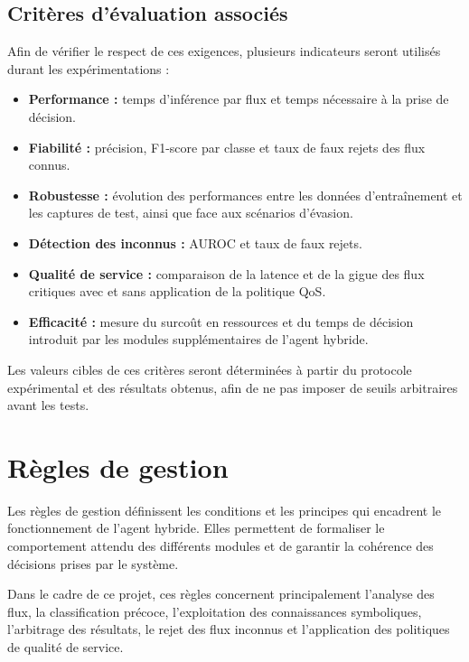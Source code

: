 \subsection{Critères d'évaluation associés}

Afin de vérifier le respect de ces exigences, plusieurs
indicateurs seront utilisés durant les expérimentations :

\begin{itemize}
    \item \textbf{Performance :} temps d'inférence par flux
    et temps nécessaire à la prise de décision.

    \item \textbf{Fiabilité :} précision, F1-score par classe
    et taux de faux rejets des flux connus.

    \item \textbf{Robustesse :} évolution des performances
    entre les données d'entraînement et les captures de test,
    ainsi que face aux scénarios d'évasion.

    \item \textbf{Détection des inconnus :} AUROC et taux
    de faux rejets.

    \item \textbf{Qualité de service :} comparaison de la
    latence et de la gigue des flux critiques avec et sans
    application de la politique QoS.

    \item \textbf{Efficacité :} mesure du surcoût en ressources
    et du temps de décision introduit par les modules
    supplémentaires de l'agent hybride.
\end{itemize}

Les valeurs cibles de ces critères seront déterminées
à partir du protocole expérimental et des résultats obtenus,
afin de ne pas imposer de seuils arbitraires avant les tests.


\section{Règles de gestion}

Les règles de gestion définissent les conditions et les principes
qui encadrent le fonctionnement de l'agent hybride. Elles
permettent de formaliser le comportement attendu des différents
modules et de garantir la cohérence des décisions prises
par le système.

Dans le cadre de ce projet, ces règles concernent principalement
l'analyse des flux, la classification précoce, l'exploitation
des connaissances symboliques, l'arbitrage des résultats,
le rejet des flux inconnus et l'application des politiques
de qualité de service.

